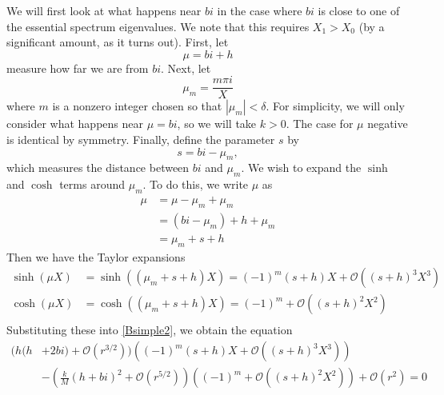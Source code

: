 \documentclass[thesis.tex]{subfiles}
\begin{document}
We will first look at what happens near $bi$ in the case where $bi$ is close to one of the essential spectrum eigenvalues. We note that this requires $X_1 > X_0$ (by a significant amount, as it turns out). First, let 
\[
\mu = bi + h
\]
measure how far we are from $bi$. Next, let 
\[
\mu_m = \frac{m \pi i}{X}
\]
where $m$ is a nonzero integer chosen so that $|\mu_m| < \delta$. For simplicity, we will only consider what happens near $\mu = b i$, so we will take $k > 0$. The case for $\mu$ negative is identical by symmetry. Finally, define the parameter $s$ by
\[
s = b i - \mu_m,
\]
which measures the distance between $bi$ and $\mu_m$. We wish to expand the $\sinh$ and $\cosh$ terms around $\mu_m$. To do this, we write $\mu$ as
\begin{align*}
\mu &= \mu - \mu_m + \mu_m \\
&= (bi - \mu_m) + h + \mu_m \\
&= \mu_m + s + h
\end{align*}
Then we have the Taylor expansions
\begin{align*}
\sinh(\mu X) &= \sinh((\mu_m + s + h)X)
= (-1)^m(s + h)X + \mathcal{O}\left( (s+h)^3 X^3 \right) \\
\cosh(\mu X) &= \cosh((\mu_m + s + h)X)
= (-1)^m + \mathcal{O}\left( (s+h)^2 X^2 \right) \\
\end{align*}
Substituting these into \cref{Bsimple2}, we obtain the equation
\begin{equation}\label{Bsimple3}
\begin{aligned}
( h(h &+ 2 bi) + \mathcal{O}( r^{3/2} ))\left( (-1)^m(s + h)X + \mathcal{O}\left( (s+h)^3 X^3 \right) \right) \\ 
&- \left(\frac{k}{M} (h + bi)^2 + \mathcal{O}( r^{5/2} ) \right)\left( (-1)^m + \mathcal{O}\left( (s+h)^2 X^2 \right) \right) + \mathcal{O}( r^2 ) = 0
\end{aligned}
\end{equation}
\end{document}
